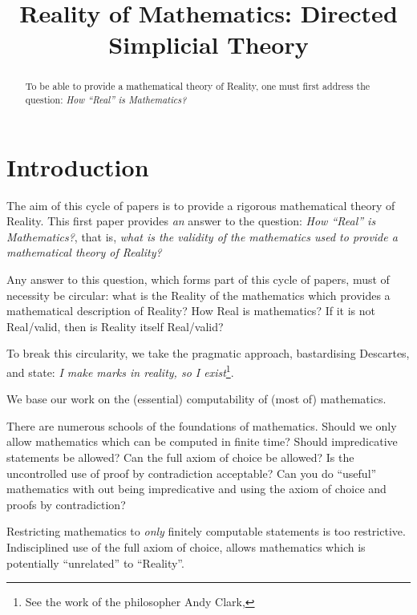 \documentclass[a4paper,openany]{amsbook}
\begin{document}
\frontmatter
\sloppy

\title[DiSimplicial Theory]{Reality of Mathematics: Directed Simplicial Theory}

%

\begin{abstract}
To be able to provide a mathematical theory of Reality, one must first 
address the question: \textit{How ``Real'' is Mathematics?}
\end{abstract} 
\maketitle 
\tableofcontents 
\mainmatter

\section{Introduction}

The aim of this cycle of papers is to provide a rigorous mathematical theory of
Reality. This first paper provides \emph{an} answer to the question: \emph{How
``Real'' is Mathematics?}, that is, \emph{what is the validity of the
mathematics used to provide a mathematical theory of Reality?}

Any answer to this question, which forms part of this cycle of papers, must of
necessity be circular: what is the Reality of the mathematics which provides a
mathematical description of Reality? How Real is mathematics? If it is not
Real/valid, then is Reality itself Real/valid?

To break this circularity, we take the pragmatic approach, bastardising
Descartes, and state: \emph{I make marks in reality, so I exist}\footnote{See
the work of the philosopher Andy Clark, }.

We base our work on the (essential) computability of (most of) mathematics.

There are numerous schools of the foundations of mathematics.  Should we only
allow mathematics which can be computed in finite time? Should impredicative
statements be allowed? Can the full axiom of choice be allowed?  Is the
uncontrolled use of proof by contradiction acceptable? Can you do ``useful''
mathematics with out being impredicative and using the axiom of choice and
proofs by contradiction?

Restricting mathematics to \emph{only} finitely computable statements is too
restrictive. Indisciplined use of the full axiom of choice, allows mathematics
which is potentially ``unrelated'' to ``Reality''.
\end{document}
